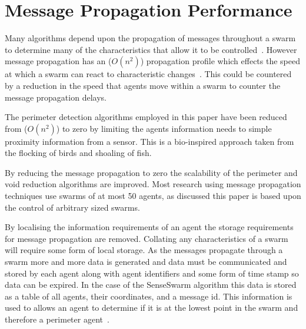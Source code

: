 \documentclass{ieeeaccess}
\begin{document}
\section{Message Propagation Performance}\label{methods:MessagePropogation}
Many algorithms depend upon the propagation of messages throughout a swarm to determine many of the characteristics that allow it to be controlled~\cite{MD:09}. However message propagation has an ($O(n^2)$) propagation profile which effects the speed at which a swarm can react to characteristic changes~\cite{SHA:07}. This could be countered by a reduction in the speed that agents move within a swarm to counter the message propagation delays. 

The perimeter detection algorithms employed in this paper have been reduced from ($O(n^2)$) to zero by limiting the agents information needs to simple proximity information from a sensor. This is a bio-inspired approach taken from the flocking of birds and shoaling of fish.

By reducing the message propagation to zero the scalability of the perimeter and void reduction algorithms are improved. Most research using message propagation techniques use swarms of at most 50 agents, as discussed this paper is based upon the control of arbitrary sized swarms.

By localising the information requirements of an agent the storage requirements for message propagation are removed. Collating any characteristics of a swarm will require some form of local storage. As the messages propagate through a swarm more and more data is generated and data must be communicated and stored by each agent along with agent identifiers and some form of time stamp so data can be expired. In the case of the SenseSwarm algorithm this data is stored as a table of all agents, their coordinates, and a message id. This information is used to allows an agent to determine if it is at the lowest point in the swarm and therefore a perimeter agent~\cite{ZAPS:07}.

\end{document}
